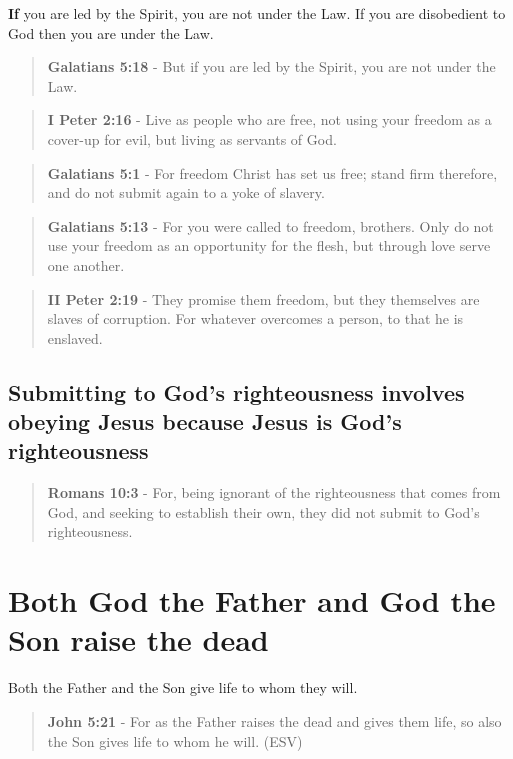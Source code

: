 \documentclass[11pt]{article}
\begin{document}
\textbf{If} you are led by the Spirit, you are not under the Law.
If you are disobedient to God then you are under the Law.

\begin{quote}
\textbf{Galatians 5:18} - But if you are led by the Spirit, you are not under the Law.
\end{quote}

\begin{quote}
\textbf{I Peter 2:16} - Live as people who are free, not using your freedom as a cover-up for evil, but living as servants of God.
\end{quote}

\begin{quote}
\textbf{Galatians 5:1} - For freedom Christ has set us free; stand firm therefore, and do not submit again to a yoke of slavery.
\end{quote}

\begin{quote}
\textbf{Galatians 5:13} - For you were called to freedom, brothers. Only do not use your freedom as an opportunity for the flesh, but through love serve one another.
\end{quote}

\begin{quote}
\textbf{II Peter 2:19} - They promise them freedom, but they themselves are slaves of corruption. For whatever overcomes a person, to that he is enslaved.
\end{quote}

\subsection{Submitting to God's righteousness involves obeying Jesus because Jesus is God's righteousness}
\label{sec:org2ba8b6f}

\begin{quote}
\textbf{Romans 10:3} - For, being ignorant of the righteousness that comes from God, and seeking to establish their own, they did not submit to God's righteousness.
\end{quote}

\section{Both God the Father and God the Son raise the dead}
\label{sec:org39086f8}
Both the Father and the Son give life to whom they will.

\begin{quote}
\textbf{John 5:21} - For as the Father raises the dead and gives them life, so also the Son gives life to whom he will. (ESV)
\end{quote}
\end{document}
